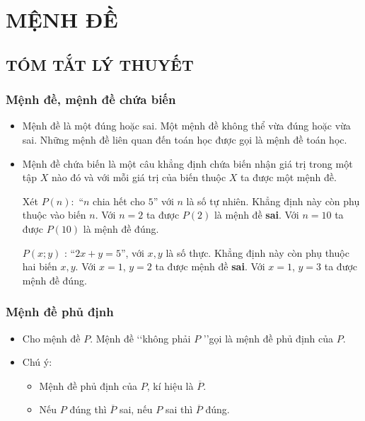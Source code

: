 \section{MỆNH ĐỀ}

\subsection{TÓM TẮT LÝ THUYẾT}
\subsubsection{Mệnh đề, mệnh đề chứa biến}
\begin{itemize}
	\item [\iconMT]  Mệnh đề là một  đúng hoặc sai. Một mệnh đề không thể vừa đúng hoặc vừa sai. Những mệnh đề liên quan đến toán học được gọi là mệnh đề toán học.
	\item [\iconMT]  Mệnh đề chứa biến là một câu khẳng định chứa biến nhận giá trị trong một tập $X$ nào đó và với mỗi giá trị của biến thuộc $X$ ta được một mệnh đề.
	\begin{vidu} Xét $P\left( n \right):$ ``$n$ chia hết cho $5$'' với $n$ là số tự nhiên. Khẳng định này còn phụ thuộc vào biến $n$. Với $n=2$ ta được $P(2)$ là mệnh đề \textbf{sai}. Với $n=10$ ta được $P(10)$ là mệnh đề đúng.
	\end{vidu}
	\begin{vidu}$P\left( x;y \right)$ : ``$2x+y=5$'', với $x,y$ là số thực. Khẳng định này còn phụ thuộc hai biến $x,y$. Với $x=1$, $y=2$ ta được mệnh đề \textbf{sai}. Với $x=1$, $y=3$ ta được mệnh đề đúng.
	\end{vidu}
\end{itemize}
\subsubsection{Mệnh đề phủ định}
\begin{itemize}
	\item [\iconMT] Cho mệnh đề $P$. Mệnh đề \lq\lq không phải $P$ \rq\rq gọi là mệnh đề phủ định của $P$.
	\item [\iconMT] Chú ý: 
		\begin{boxkn}
	\begin{itemize}
		\item  Mệnh đề phủ định của $P$, kí hiệu là $\overline{P}$.
		\item  Nếu $P$ đúng thì $\overline{P}$ sai, nếu $P$ sai thì $\overline{P}$ đúng.
	\end{itemize}
	\end{boxkn}
\end{itemize}
